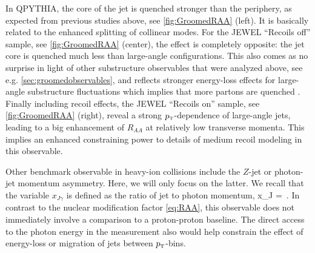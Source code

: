 In QPYTHIA, the core of the jet is quenched stronger than the periphery, as expected from previous studies above, see \autoref{fig:GroomedRAA} (left). It is basically related to the enhanced splitting of collinear modes. For the JEWEL ``Recoils off'' sample, see \autoref{fig:GroomedRAA} (center), the effect is completely opposite: the jet core is quenched much less than large-angle configurations. This also comes as no surprise in light  of other substructure observables that were analyzed above, see e.g. \autoref{sec:groomedobservables}, and reflects stronger energy-loss effects for large-angle substructure fluctuations which implies that more partons are quenched \cite{Milhano:2015mng}. Finally including recoil effects, the JEWEL ``Recoils on'' sample, see \autoref{fig:GroomedRAA} (right), reveal a strong $p_{\text{\tiny T}}$-dependence of large-angle jets, leading to a big enhancement of $R_{AA}$ at relatively low transverse momenta. This implies an enhanced constraining power to details of medium recoil modeling in this observable.

Other benchmark observable in heavy-ion collisions include the $Z$-jet or photon-jet momentum asymmetry. Here, we will only focus on the latter.
We recall that the variable $x_{J\gamma}$ is defined as the ratio of jet to photon momentum, 
\beq
x_{J\gamma} =  \,.
\eeq
In contrast to the nuclear modification factor \eqref{eq:RAA}, this observable does not immediately involve a comparison to a proton-proton baseline. The direct access to the photon energy in the measurement also would help constrain the effect of energy-loss or migration of jets between $p_{\text{\tiny T}}$-bins.

